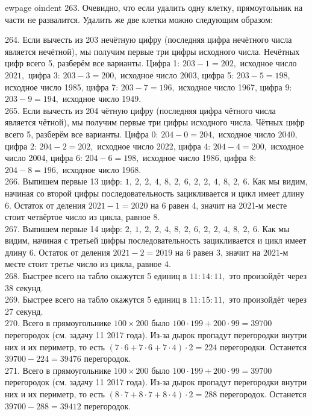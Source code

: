 ewpage
oindent
263. Очевидно, что если удалить одну клетку, прямоугольник на части не развалится. Удалить же две клетки можно следующим образом:
\begin{center}
\begin{figure}[ht!]
\end{figure}
\end{center}
264. Если вычесть из 203 нечётную цифру (последняя цифра нечётного числа является нечётной), мы получим первые три цифры исходного числа. Нечётных цифр всего 5, разберём все варианты. Цифра 1: $203-1=202,$ исходное число $2021,$ цифра 3: $203-3=200,$ исходное число 2003, цифра 5: $203-5=198,$ исходное число 1985, цифра 7: $203-7=196,$ исходное число 1967, цифра 9: $203-9=194,$ исходное число 1949.\\
265. Если вычесть из 204 чётную цифру (последняя цифра чётного числа является чётной), мы получим первые три цифры исходного числа. Чётных цифр всего 5, разберём все варианты. Цифра 0: $204-0=204,$ исходное число $2040,$ цифра 2: $204-2=202,$ исходное число 2022, цифра 4: $204-4=200,$ исходное число 2004, цифра 6: $204-6=198,$ исходное число 1986, цифра 8: $204-8=196,$ исходное число 1968.\\
266. Выпишем первые 13 цифр: $1,\ 2,\ 2,\ 4,\ 8,\ 2,\ 6,\ 2,\ 2,\ 4,\ 8,\ 2,\ 6.$ Как мы видим, начиная со второй цифры последовательность зацикливается и цикл имеет длину 6. Остаток от деления $2021-1=2020$ на 6 равен 4, значит на 2021-м месте стоит четвёртое число из цикла, равное 8.\\
267. Выпишем первые 14 цифр: $2,\ 1,\ 2,\ 2,\ 4,\ 8,\ 2,\ 6,\ 2,\ 2,\ 4,\ 8,\ 2,\ 6.$ Как мы видим, начиная с третьей цифры последовательность зацикливается и цикл имеет длину 6. Остаток от деления $2021-2=2019$ на 6 равен 3, значит на 2021-м месте стоит третье число из цикла, равное 4.\\
268. Быстрее всего на табло окажутся 5 единиц в $11:14:11,$ это произойдёт через 38 секунд.\\
269. Быстрее всего на табло окажутся 5 единиц в $11:15:11,$ это произойдёт через 27 секунд.\\
270. Всего в прямоугольнике $100\times200$ было $100\cdot199+200\cdot99=39700$ перегородок (см. задачу 11 2017 года). Из-за дырок пропадут перегородки внутри них и их периметр, то есть $(7\cdot6+7\cdot6+7\cdot4)\cdot2=224$ перегородки. Останется $39700-224=39476$ перегородок.\\
271. Всего в прямоугольнике $100\times200$ было $100\cdot199+200\cdot99=39700$ перегородок (см. задачу 11 2017 года). Из-за дырок пропадут перегородки внутри них и их периметр, то есть $(8\cdot7+8\cdot7+8\cdot4)\cdot2=288$ перегородок. Останется $39700-288=39412$ перегородок.\\
